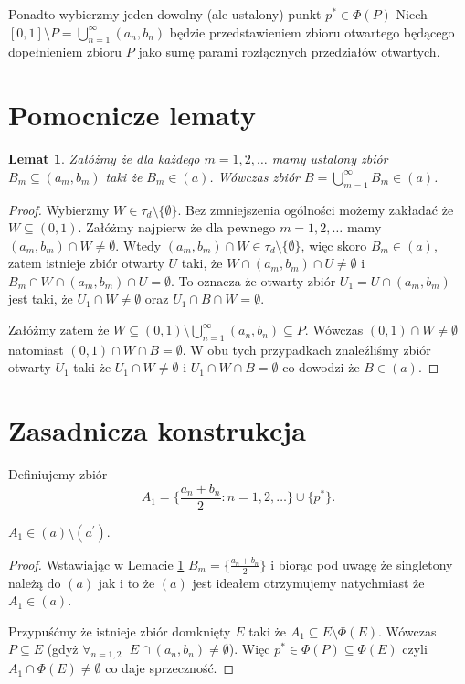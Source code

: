 \documentclass[12pt]{amsart}
\theoremstyle{plain}
\newtheorem{lemma}[theorem]{Lemat}
\theoremstyle{definition}
\theoremstyle{remark}
\newcommand{\aideal}{\mathit{(a)}}
\newcommand{\aidealprime}{\mathit{(a^\prime)}}
\begin{document}
Ponadto wybierzmy jeden dowolny (ale ustalony) punkt $p^* \in \Phi(P)$
Niech $[0, 1] \setminus P = \bigcup_{n=1}^\infty (a_n, b_n)$ będzie
przedstawieniem zbioru otwartego będącego dopełnieniem zbioru $P$
jako sumę parami rozłącznych przedziałów otwartych.

\section{Pomocnicze lematy}

\begin{lemma}
\label{lemat-o-sumie}
Załóżmy że dla każdego $m = 1,2,\ldots$ mamy ustalony zbiór
$B_m \subseteq (a_m, b_m)$ taki że $B_m \in \aideal$.
Wówczas zbiór $B = \bigcup_{m=1}^{\infty} B_m \in \aideal$.
\end{lemma}

\begin{proof}
Wybierzmy $W \in \tau_d \setminus \lbrace \emptyset \rbrace$.
Bez zmniejszenia ogólności możemy zakładać że 
$W \subseteq (0, 1)$. Załóżmy najpierw że dla pewnego 
$m = 1,2,\ldots$ mamy $(a_m, b_m) \cap W \not= \emptyset$.
Wtedy $(a_m, b_m) \cap W \in \tau_d \setminus \lbrace \emptyset \rbrace$,
więc skoro $B_m \in \aideal$, zatem istnieje zbiór otwarty $U$ 
taki, że $W \cap (a_m, b_m) \cap U \not=\emptyset$
i $B_m \cap W \cap (a_m, b_m) \cap U = \emptyset$. To oznacza że
otwarty zbiór $U_1 = U \cap (a_m, b_m)$ jest taki, że $U_1 \cap W \not=\emptyset$
oraz $U_1 \cap B \cap W = \emptyset$.

Załóżmy zatem że $W \subseteq (0,1) \setminus \bigcup_{n=1}^\infty (a_n, b_n) \subseteq P$.
Wówczas $(0,1) \cap W \not= \emptyset$
natomiast  $(0,1) \cap W \cap B = \emptyset$.
W obu tych przypadkach znaleźliśmy zbiór otwarty $U_1$ taki że
$U_1 \cap W \not=\emptyset$ i $U_1 \cap W \cap B = \emptyset$
co dowodzi że $B \in \aideal$.
\end{proof}

\section{Zasadnicza konstrukcja}

Definiujemy zbiór
\[ A_1 = \lbrace \frac{a_n + b_n}{2} \colon n = 1,2,\ldots\rbrace \cup \lbrace p^* \rbrace.
\]

 $A_1 \in \aideal \setminus \aidealprime$.
\begin{proof}
Wstawiając w Lemacie \ref{lemat-o-sumie} 
$B_m = \lbrace \frac{a_n + b_n}{2} \rbrace$
i biorąc pod uwagę że singletony należą do $\aideal$ jak i to że
$\aideal$ jest ideałem otrzymujemy natychmiast że $A_1 \in \aideal$.

\smallskip

Przypuśćmy że istnieje zbiór domknięty $E$ taki że
$A_1 \subseteq E \setminus \Phi(E)$.
Wówczas $P \subseteq E$ (gdyż $\forall_{n=1,2\ldots} E \cap (a_n, b_n) \not= \emptyset$).
Więc $p^* \in \Phi(P) \subseteq \Phi(E)$ czyli $A_1 \cap \Phi(E) \not= \emptyset$
co daje sprzeczność.
\end{proof}
\end{document}
